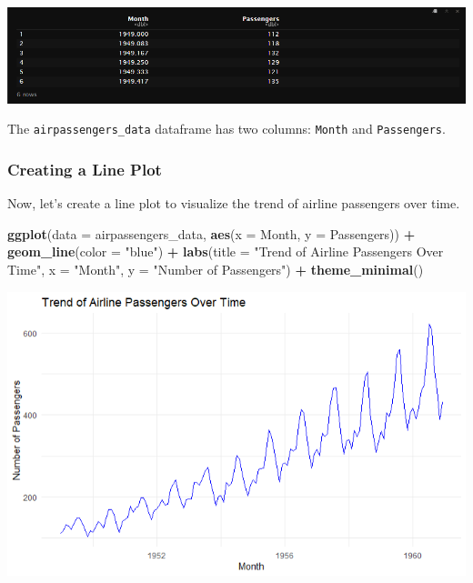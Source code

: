\documentclass[
]{book}
\newenvironment{Shaded}{\begin{snugshade}}{\end{snugshade}}
\newcommand{\AttributeTok}[1]{\textcolor[rgb]{0.13,0.29,0.53}{#1}}
\newcommand{\FunctionTok}[1]{\textcolor[rgb]{0.13,0.29,0.53}{\textbf{#1}}}
\newcommand{\NormalTok}[1]{#1}
\newcommand{\SpecialCharTok}[1]{\textcolor[rgb]{0.81,0.36,0.00}{\textbf{#1}}}
\newcommand{\StringTok}[1]{\textcolor[rgb]{0.31,0.60,0.02}{#1}}
\begin{document}
\includegraphics{images/airplane_table_head.PNG}

The \texttt{airpassengers\_data} dataframe has two columns: \texttt{Month} and \texttt{Passengers}.

\hypertarget{creating-a-line-plot}{%
\subsubsection*{Creating a Line Plot}\label{creating-a-line-plot}}

Now, let's create a line plot to visualize the trend of airline passengers over time.

\begin{Shaded}
\begin{Highlighting}[]
\FunctionTok{ggplot}\NormalTok{(}\AttributeTok{data =}\NormalTok{ airpassengers\_data, }\FunctionTok{aes}\NormalTok{(}\AttributeTok{x =}\NormalTok{ Month, }\AttributeTok{y =}\NormalTok{ Passengers)) }\SpecialCharTok{+}
  \FunctionTok{geom\_line}\NormalTok{(}\AttributeTok{color =} \StringTok{"blue"}\NormalTok{) }\SpecialCharTok{+}
  \FunctionTok{labs}\NormalTok{(}\AttributeTok{title =} \StringTok{"Trend of Airline Passengers Over Time"}\NormalTok{,}
       \AttributeTok{x =} \StringTok{"Month"}\NormalTok{,}
       \AttributeTok{y =} \StringTok{"Number of Passengers"}\NormalTok{) }\SpecialCharTok{+}
  \FunctionTok{theme\_minimal}\NormalTok{()}
\end{Highlighting}
\end{Shaded}

\includegraphics{images/line_graph_example.PNG}
\end{document}
